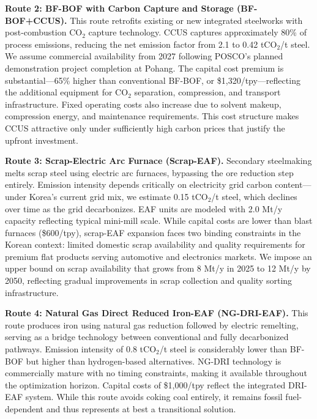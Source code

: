 \documentclass[preprint,1p,authoryear]{elsarticle}
\begin{document}
\textbf{Route 2: BF-BOF with Carbon Capture and Storage (BF-BOF+CCUS).} This route retrofits existing or new integrated steelworks with post-combustion CO$_2$ capture technology. CCUS captures approximately 80\% of process emissions, reducing the net emission factor from 2.1 to 0.42 tCO$_2$/t steel. We assume commercial availability from 2027 following POSCO's planned demonstration project completion at Pohang. The capital cost premium is substantial—65\% higher than conventional BF-BOF, or \$1,320/tpy—reflecting the additional equipment for CO$_2$ separation, compression, and transport infrastructure. Fixed operating costs also increase due to solvent makeup, compression energy, and maintenance requirements. This cost structure makes CCUS attractive only under sufficiently high carbon prices that justify the upfront investment.

\textbf{Route 3: Scrap-Electric Arc Furnace (Scrap-EAF).} Secondary steelmaking melts scrap steel using electric arc furnaces, bypassing the ore reduction step entirely. Emission intensity depends critically on electricity grid carbon content—under Korea's current grid mix, we estimate 0.15 tCO$_2$/t steel, which declines over time as the grid decarbonizes. EAF units are modeled with 2.0 Mt/y capacity reflecting typical mini-mill scale. While capital costs are lower than blast furnaces (\$600/tpy), scrap-EAF expansion faces two binding constraints in the Korean context: limited domestic scrap availability and quality requirements for premium flat products serving automotive and electronics markets. We impose an upper bound on scrap availability that grows from 8 Mt/y in 2025 to 12 Mt/y by 2050, reflecting gradual improvements in scrap collection and quality sorting infrastructure.

\textbf{Route 4: Natural Gas Direct Reduced Iron-EAF (NG-DRI-EAF).} This route produces iron using natural gas reduction followed by electric remelting, serving as a bridge technology between conventional and fully decarbonized pathways. Emission intensity of 0.8 tCO$_2$/t steel is considerably lower than BF-BOF but higher than hydrogen-based alternatives. NG-DRI technology is commercially mature with no timing constraints, making it available throughout the optimization horizon. Capital costs of \$1,000/tpy reflect the integrated DRI-EAF system. While this route avoids coking coal entirely, it remains fossil fuel-dependent and thus represents at best a transitional solution.
\end{document}
